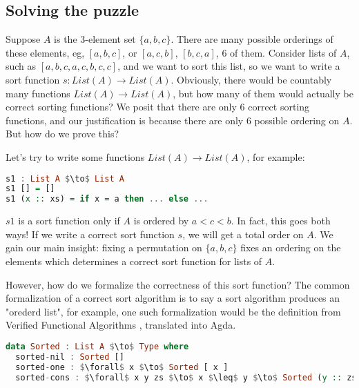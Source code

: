 \subsection*{Solving the puzzle}

Suppose $A$ is the 3-element set $\{a,b,c\}$. There are many possible orderings of these elements,
eg, $[a,b,c]$, or $[a,c,b]$, $[b,c,a]$, 6 of them.
Consider lists of $A$, such as $[a,b,c,a,c,b,c,c]$, and we want to sort this list, so we want to write a sort function $s\colon List(A) \to List(A)$.
Obviously, there would be countably many functions $List(A) \to List(A)$, but how many of them
would actually be correct sorting functions? We posit that there are only 6 correct sorting
functions, and our justification is because there are only 6 possible ordering on $A$.
But how do we prove this?

Let's try to write some functions $List(A) \to List(A)$, for example:
\begin{lstlisting}[language=haskell]
s1 : List A $\to$ List A
s1 [] = []
s1 (x :: xs) = if x = a then ... else ...
\end{lstlisting}
$s1$ is a sort function only if $A$ is ordered by $a < c < b$.
In fact, this goes both ways!
If we write a correct sort function $s$, we will get a total order on $A$.
We gain our main insight: fixing a permutation on $\{a,b,c\}$ fixes an ordering on the elements which determines a correct sort function for lists of $A$.


However, how do we formalize the correctness of this sort function?
The common formalization of a correct sort algorithm is to say a sort algorithm produces
an "orederd list", for example, one such formalization would be the definition
from Verified Functional Algorithms \cite{appelVerifiedFunctionalAlgorithms}, translated into Agda.

\begin{lstlisting}[language=Haskell]
data Sorted : List A $\to$ Type where
  sorted-nil : Sorted []
  sorted-one : $\forall$ x $\to$ Sorted [ x ]
  sorted-cons : $\forall$ x y zs $\to$ x $\leq$ y $\to$ Sorted (y :: zs) $\to$ Sorted (x :: y :: zs)
\end{lstlisting}

